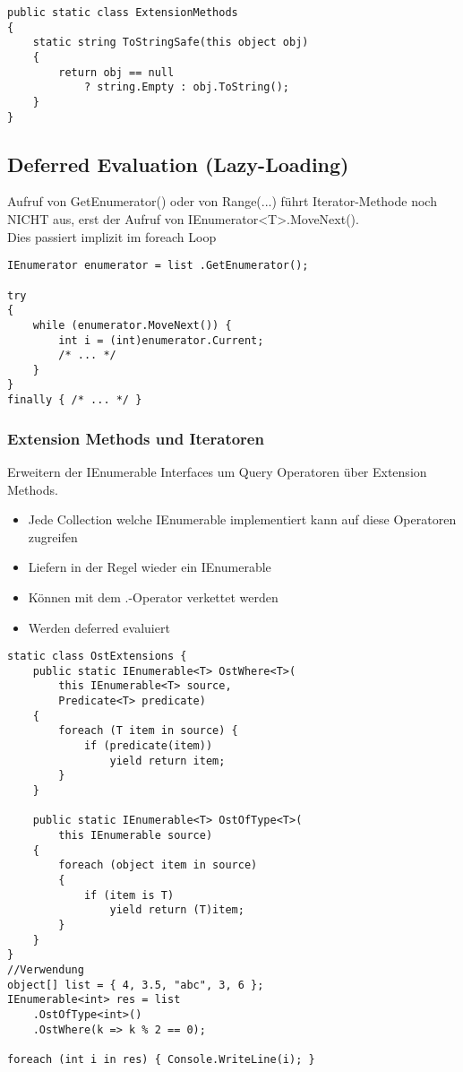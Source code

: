 \begin{multicols*}{2}
\begin{lstlisting}
public static class ExtensionMethods 
{
    static string ToStringSafe(this object obj) 
    {
        return obj == null
            ? string.Empty : obj.ToString();
    }
}
\end{lstlisting}

\subsection{Deferred Evaluation (Lazy-Loading)}
Aufruf von GetEnumerator() oder von Range(...) führt Iterator-Methode noch NICHT aus, 
erst der Aufruf von IEnumerator<T>.MoveNext().\\
Dies passiert implizit im foreach Loop
\begin{lstlisting}
IEnumerator enumerator = list .GetEnumerator();

try
{
    while (enumerator.MoveNext()) {
        int i = (int)enumerator.Current;
        /* ... */
    } 
}
finally { /* ... */ }   
\end{lstlisting}
\subsubsection{Extension Methods und Iteratoren}
Erweitern der IEnumerable Interfaces um Query Operatoren über Extension Methods.
\begin{itemize}
    \item Jede Collection welche IEnumerable implementiert kann auf diese Operatoren zugreifen
    \item Liefern in der Regel wieder ein IEnumerable
    \item Können mit dem \dq.\dq-Operator verkettet werden
    \item Werden deferred evaluiert
\end{itemize}
\begin{lstlisting}
static class OstExtensions {
    public static IEnumerable<T> OstWhere<T>(
        this IEnumerable<T> source,
        Predicate<T> predicate)
    {
        foreach (T item in source) {
            if (predicate(item))
                yield return item;
        } 
    }

    public static IEnumerable<T> OstOfType<T>(
        this IEnumerable source)
    {
        foreach (object item in source)
        {
            if (item is T)
                yield return (T)item;
        } 
    }
}
//Verwendung
object[] list = { 4, 3.5, "abc", 3, 6 };
IEnumerable<int> res = list
    .OstOfType<int>()
    .OstWhere(k => k % 2 == 0);

foreach (int i in res) { Console.WriteLine(i); }
\end{lstlisting}


\end{multicols*}